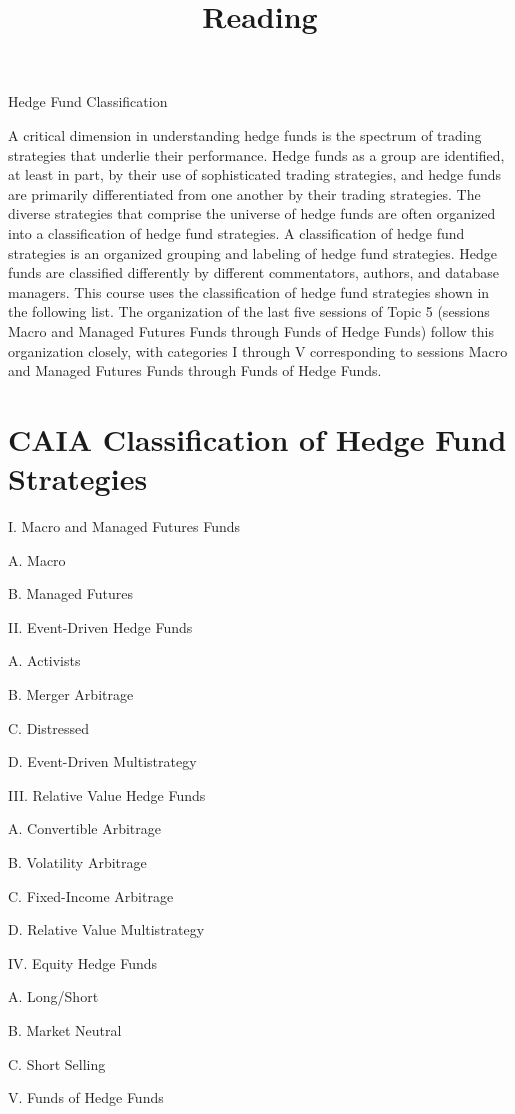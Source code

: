 \documentclass[11pt]{article}
\title{Reading }
\author{}
\date{}
\begin{document}
\maketitle
Hedge Fund Classification

A critical dimension in understanding hedge funds is the spectrum of trading strategies that underlie their performance. Hedge funds as a group are identified, at least in part, by their use of sophisticated trading strategies, and hedge funds are primarily differentiated from one another by their trading strategies. The diverse strategies that comprise the universe of hedge funds are often organized into a classification of hedge fund strategies. A classification of hedge fund strategies is an organized grouping and labeling of hedge fund strategies. Hedge funds are classified differently by different commentators, authors, and database managers. This course uses the classification of hedge fund strategies shown in the following list. The organization of the last five sessions of Topic 5 (sessions Macro and Managed Futures Funds through Funds of Hedge Funds) follow this organization closely, with categories I through V corresponding to sessions Macro and Managed Futures Funds through Funds of Hedge Funds.

\section*{CAIA Classification of Hedge Fund Strategies}
I. Macro and Managed Futures Funds

A. Macro

B. Managed Futures

II. Event-Driven Hedge Funds

A. Activists

B. Merger Arbitrage

C. Distressed

D. Event-Driven Multistrategy

III. Relative Value Hedge Funds

A. Convertible Arbitrage

B. Volatility Arbitrage

C. Fixed-Income Arbitrage

D. Relative Value Multistrategy

IV. Equity Hedge Funds

A. Long/Short

B. Market Neutral

C. Short Selling

V. Funds of Hedge Funds
\end{document}
